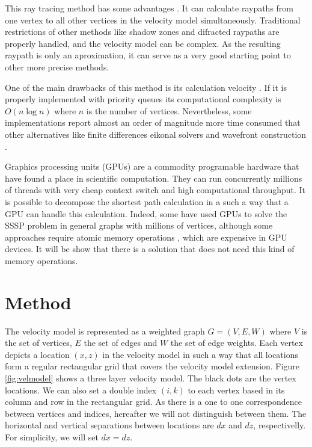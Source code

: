 This ray tracing method has some advantages \cite[]{doi:10.1190/1.1442958}.
It can calculate raypaths from one vertex to all other vertices in the 
velocity model simultaneously. Traditional restrictions of other methods
like shadow zones and difracted raypaths are properly handled, and the velocity
model can be complex. As the resulting raypath is only an aproximation, it
can serve as a very good starting point to other more precise methods.

One of the main drawbacks of this method is its calculation velocity \cite[]{GPR:GPR124}.
If it is properly implemented with priority queues its computational 
complexity is $O(n\log n)$ where $n$ is the number of vertices. Nevertheless,
some implementations report almost an order of magnitude more time consumed
that other alternatives like finite differences eikonal solvers and wavefront 
construction \cite[]{GPR:GPR124}.

Graphics processing units (GPUs) are a commodity programable hardware
that have found a place in scientific computation. They can run 
concurrently millions of threads with
very cheap context switch and high computational throughput. It is
possible to decompose the shortest path calculation in
a such a way that a GPU can handle this calculation.
Indeed, some have used GPUs to solve the SSSP problem in general graphs 
with millions of vertices, although some approaches require atomic 
memory operations \cite[]{Harish:2007:ALG:1782174.1782200},
which are  expensive in GPU devices. It will
be show that there is a solution that does not need this kind of 
memory operations.

\section*{Method}

The velocity model is represented as a weighted graph 
$G=(V,E,W)$ where $V$ is the set of vertices, $E$ the set of
edges and $W$ the set of edge weights. Each vertex depicts
a location $(x,z)$ in the velocity model in such a way that
all locations form a regular rectangular grid that covers
the velocity model extension. Figure \ref{fig:velmodel}
shows a three layer velocity model. The black dots are 
the vertex locations. We can also set a double index $(i,k)$
to each vertex based in its column and row in the rectangular
grid. As there is a one to one correspondence between vertices 
and indices, hereafter we will not distinguish
between them. The horizontal and vertical separations between 
locations are $dx$ and $dz$, respectivelly. For simplicity, we will
set $dx=dz$.

